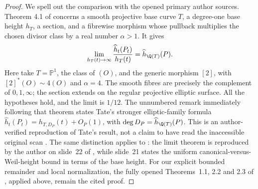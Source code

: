 \begin{proof}
We spell out the comparison with the opened primary author sources.
Theorem 4.1 of \citet[pp.~183--184]{callSilverman1993} concerns a
smooth projective base curve $T$, a degree-one base height $h_T$,
a section, and a fibrewise morphism whose pullback multiplies the
chosen divisor class by a real number $\alpha>1$. It gives
\[
 \lim_{h_T(t)\to\infty}
 \frac{\widehat h_t(P_t)}{h_T(t)}
       =\widehat h_{\Q(T)}(P).
\]
Here take $T=\mathbb P^1$, the class of $(O)$, and the generic
morphism $[2]$, with $[2]^*(O)\sim4(O)$ and $\alpha=4$.
The smooth fibres are precisely the complement of $0,1,\infty$;
the section extends on the regular projective elliptic surface.
All the hypotheses hold, and the limit is $1/12$.
The unnumbered remark immediately following that theorem states
Tate's stronger elliptic-family formula
$\widehat h_t(P_t)=h_{T,D_P}(t)+O_P(1)$, with
$\deg D_P=\widehat h_{\Q(T)}(P)$. This is an author-verified
reproduction of Tate's result, not a claim to have read the
inaccessible original scan \citep{tate1983variation}.
The same distinction applies to \citet{silverman1983specialization}:
the limit theorem is reproduced by the author on slide~22 of
\citet{silverman2006heights}, while slide~21 states the uniform
canonical-versus-Weil-height bound in terms of the base height.
For our explicit bounded remainder and local normalization, the
fully opened Theorems~1.1, 2.2 and 2.3 of
\citet{demarco2017}, applied above, remain the cited proof.
\end{proof}
